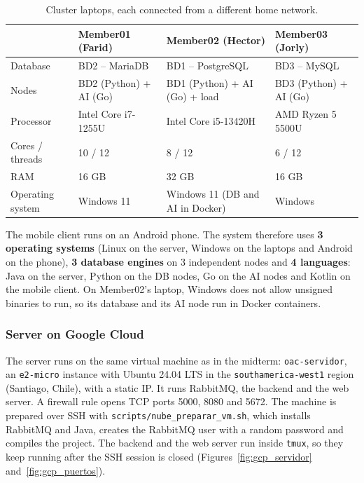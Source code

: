 \documentclass[10pt,a4paper]{article}
\begin{document}
\begin{table}[H]
\centering
\small
\begin{tabularx}{\textwidth}{p{2.6cm}XXX}
\toprule
 & \textbf{Member01 (Farid)} & \textbf{Member02 (Hector)} & \textbf{Member03 (Jorly)} \\
\midrule
Database & BD2 -- MariaDB & BD1 -- PostgreSQL & BD3 -- MySQL \\
Nodes & BD2 (Python) + AI (Go) & BD1 (Python) + AI (Go) + load & BD3 (Python) + AI (Go) \\
Processor & Intel Core i7-1255U & Intel Core i5-13420H & AMD Ryzen 5 5500U \\
Cores / threads & 10 / 12 & 8 / 12 & 6 / 12 \\
RAM & 16 GB & 32 GB & 16 GB \\
Operating system & Windows 11 & Windows 11 (DB and AI in Docker) & Windows \\
\bottomrule
\end{tabularx}
\caption{Cluster laptops, each connected from a different home network.}
\label{tab:montaje}
\end{table}

The mobile client runs on an Android phone. The system therefore uses \textbf{3 operating systems}
(Linux on the server, Windows on the laptops and Android on the phone), \textbf{3 database engines} on
3 independent nodes and \textbf{4 languages}: Java on the server, Python on the DB nodes, Go on the AI
nodes and Kotlin on the mobile client. On Member02's laptop, Windows does not allow unsigned binaries
to run, so its database and its AI node run in Docker containers.

\subsubsection{Server on Google Cloud}

The server runs on the same virtual machine as in the midterm: \texttt{oac-servidor}, an
\texttt{e2-micro} instance with Ubuntu 24.04 LTS in the \texttt{southamerica-west1} region (Santiago,
Chile), with a static IP. It runs RabbitMQ, the backend and the web server. A firewall rule opens TCP
ports 5000, 8080 and 5672. The machine is prepared over SSH with \texttt{scripts/nube\_preparar\_vm.sh},
which installs RabbitMQ and Java, creates the RabbitMQ user with a random password and compiles the
project. The backend and the web server run inside \texttt{tmux}, so they keep running after the SSH
session is closed (Figures~\ref{fig:gcp_servidor} and~\ref{fig:gcp_puertos}).
\end{document}
